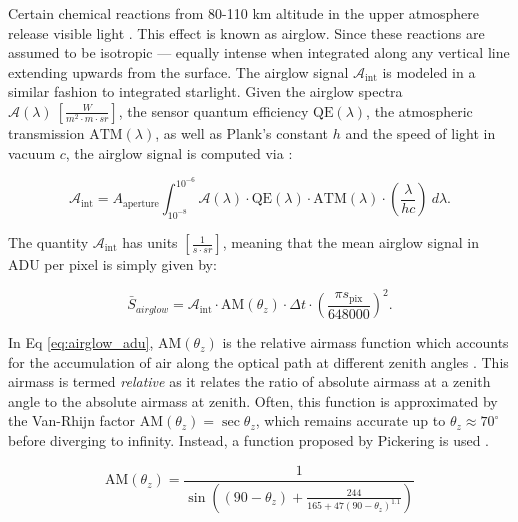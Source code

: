 Certain chemical reactions from 80-110 km altitude in the upper atmosphere release visible light
\cite{krag2003}. This effect is known as
airglow. Since these reactions are assumed to be isotropic ---  equally intense when integrated along any
vertical line extending upwards from the surface. The airglow signal $\mathcal{A}_\mathrm{int}$ is modeled in a
similar fashion to integrated starlight. Given the airglow spectra $\mathcal{A}(\lambda) \:
\left[ \frac{W}{m^2\cdot m \cdot sr} \right]$, the sensor quantum efficiency $\textrm{QE}(\lambda)$, the atmospheric transmission $\textrm{ATM}(\lambda)$, as well as Plank's constant $h$ and the speed of light in vacuum $c$, the airglow signal is computed via \cite{krag2003}:

\begin{equation} \label{eq:aint}
 \mathcal{A}_\mathrm{int} = A_\mathrm{aperture}
  \int_{10^{-8}}^{10^{-6}}{ \mathcal{A}(\lambda) \cdot \textrm{QE}(\lambda) \cdot \textrm{ATM}(\lambda)
  \cdot \left( \frac{\lambda}{h c} \right) \: d\lambda}.
\end{equation}

The quantity $\mathcal{A}_\mathrm{int}$ has units $\left[ \frac{1}{s\cdot sr} \right]$, meaning that the
mean airglow signal in ADU per pixel is simply given by:

\begin{equation} \label{eq:airglow_adu}
  \bar{S}_{airglow} = \mathcal{A}_\mathrm{int} \cdot \textrm{AM}(\theta_z) \cdot \Delta t \cdot \left( \frac{\pi s_\mathrm{pix}}{648000} \right)^2.
\end{equation}

In Eq \ref{eq:airglow_adu}, $\textrm{AM}(\theta_z)$ is the relative airmass function which accounts for the accumulation of air along the optical path at different zenith angles \cite{frueh2019notes}. This airmass is termed \textit{relative} as it relates the ratio of absolute airmass at a zenith angle to the absolute airmass at zenith. Often, this function is approximated by the Van-Rhijn factor $\textrm{AM}(\theta_z) = \sec{\theta_z}$, which remains accurate up to $\theta_z \approx 70^\circ$ before diverging to infinity. Instead, a function proposed by Pickering is used \cite{pickering2002}.

\begin{equation} \label{eq:pickering_airmass}
  \textrm{AM}(\theta_z) = \frac{1}{\sin\left((90 - \theta_z) +  \frac{244}{165 + 47 \left(90 - \theta_z \right)^{1.1}}\right)}
\end{equation}


